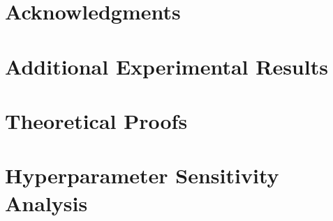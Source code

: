 \documentclass{article}
\begin{document}


\section*{Acknowledgments}







\appendix

\section{Additional Experimental Results}
\label{app:additional}


\section{Theoretical Proofs}
\label{app:proofs}


\section{Hyperparameter Sensitivity Analysis}
\label{app:hyperparams}

\end{document}
